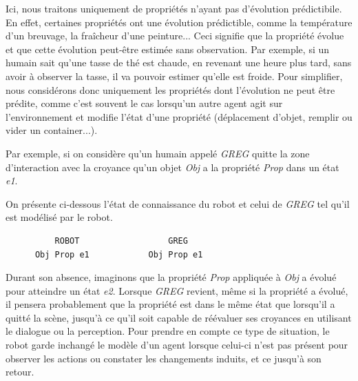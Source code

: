\documentclass[a4paper,11pt,twoside]{StyleThese}
\begin{document}


Ici, nous traitons uniquement de propriétés n'ayant pas d'évolution prédictibile. En effet, certaines propriétés ont une évolution prédictible, comme la température d'un breuvage, la fraîcheur d'une peinture... Ceci signifie que la propriété évolue et que cette évolution peut-être estimée sans observation. Par exemple, si un humain sait qu'une tasse de thé est chaude, en revenant une heure plus tard, sans avoir à observer la tasse, il va pouvoir estimer qu'elle est froide.
Pour simplifier, nous considérons donc uniquement les propriétés dont l'évolution ne peut être prédite, comme c'est souvent le cas lorsqu'un autre agent agit sur l'environnement et modifie l'état d'une propriété (déplacement d'objet, remplir ou vider un container...).

Par exemple, si on considère qu'un humain appelé \textit{GREG} quitte la zone d'interaction avec la croyance qu'un objet \textit{Obj} a la propriété \textit{Prop} dans un état \textit{e1}.

On présente ci-dessous l'état de connaissance du robot et celui de \textit{GREG} tel qu'il est modélisé par le robot.

\begin{scriptsize}
\begin{verbatim}
          ROBOT                  GREG
      Obj Prop e1            Obj Prop e1
\end{verbatim}
\end{scriptsize}

Durant son absence, imaginons que la propriété \textit{Prop} appliquée à \textit{Obj} a évolué pour atteindre un état \textit{e2}.
Lorsque \textit{GREG} revient, même si la propriété a évolué, il pensera probablement que la propriété est dans le même état que lorsqu'il a quitté la scène, jusqu'à ce qu'il soit capable de réévaluer ses croyances en utilisant le dialogue ou la perception. Pour prendre en compte ce type de situation, le robot garde inchangé le modèle d'un agent lorsque celui-ci n'est pas présent pour observer les actions ou constater les changements induits, et ce jusqu'à son retour.
\end{document}
